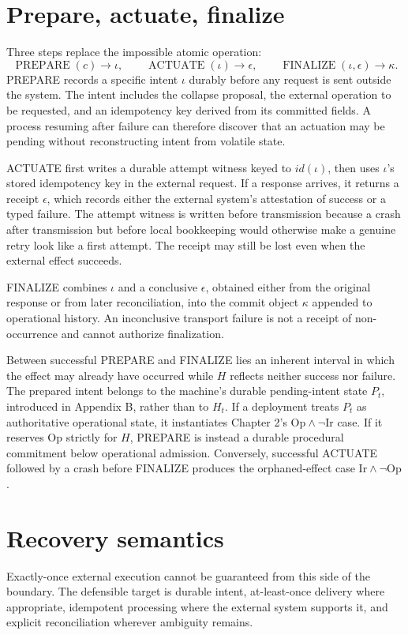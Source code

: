 \documentclass[11pt,openany]{book}
\begin{document}
\section{Prepare, actuate, finalize}
Three steps replace the impossible atomic operation:
\[
 \operatorname{PREPARE}(c)\to\iota,
 \qquad
 \operatorname{ACTUATE}(\iota)\to\epsilon,
 \qquad
 \operatorname{FINALIZE}(\iota,\epsilon)\to\kappa.
\]
PREPARE records a specific intent \(\iota\) durably before any request is
sent outside the system. The intent includes the collapse proposal, the
external operation to be requested, and an idempotency key derived from its
committed fields. A process resuming after failure can therefore discover that
an actuation may be pending without reconstructing intent from volatile state.

ACTUATE first writes a durable attempt witness keyed to \(id(\iota)\), then
uses \(\iota\)'s stored idempotency key in the external request. If a response
arrives, it returns a receipt \(\epsilon\), which records either the external
system's attestation of success or a typed failure. The attempt witness is
written before transmission because a crash after transmission but before
local bookkeeping would otherwise make a genuine retry look like a first
attempt. The receipt may still be lost even when the external effect succeeds.

FINALIZE combines \(\iota\) and a conclusive \(\epsilon\), obtained either
from the original response or from later reconciliation, into the commit object
\(\kappa\) appended to operational history. An inconclusive transport failure
is not a receipt of non-occurrence and cannot authorize finalization.

Between successful PREPARE and FINALIZE lies an inherent interval in which the
effect may already have occurred while \(H\) reflects neither success nor
failure. The prepared intent belongs to the machine's durable pending-intent
state \(P_t\), introduced in Appendix B, rather than to \(H_t\). If a deployment
treats \(P_t\) as authoritative operational state, it instantiates Chapter 2's
\(\mathrm{Op}\land\lnot\mathrm{Ir}\) case. If it reserves
\(\mathrm{Op}\) strictly for \(H\), PREPARE is instead a durable procedural
commitment below operational admission. Conversely, successful ACTUATE followed
by a crash before FINALIZE produces the orphaned-effect case
\(\mathrm{Ir}\land\lnot\mathrm{Op}\).

\section{Recovery semantics}
Exactly-once external execution cannot be guaranteed from this side of the
boundary. The defensible target is durable intent, at-least-once delivery where
appropriate, idempotent processing where the external system supports it, and
explicit reconciliation wherever ambiguity remains.
\end{document}
